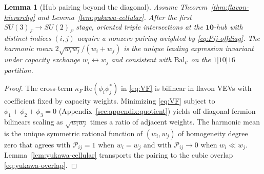 \documentclass[11pt]{article}
\theoremstyle{plain}
\newtheorem{lemma}[theorem]{Lemma}
\theoremstyle{definition}
\theoremstyle{remark}
\numberwithin{equation}{section}
\begin{document}
\begin{lemma}[Hub pairing beyond the diagonal]\label{lem:Pij-hub}
Assume Theorem~\ref{thm:flavon-hierarchy} and Lemma~\ref{lem:yukawa-cellular}.
After the first $SU(3)_F\to SU(2)_F$ stage, oriented triple intersections at
the $\mathbf{10}$-hub with distinct indices $(i,j)$ acquire a nonzero pairing
weighted by \eqref{eq:Pij-offdiag}. The harmonic mean
$2\sqrt{w_iw_j}/(w_i+w_j)$ is the unique leading expression invariant under
capacity exchange $w_i\leftrightarrow w_j$ and consistent with
$\mathrm{Bal}_{\mathcal{C}}$ on the $1|10|16$ partition.
\end{lemma}

\begin{proof}
The cross-term $\kappa_F\,\mathrm{Re}(\phi_i\phi_j^*)$ in \eqref{eq:VF} is
bilinear in flavon VEVs with coefficient fixed by capacity weights. Minimizing
\eqref{eq:VF} subject to $\phi_1+\phi_2+\phi_3=0$ (Appendix~\ref{sec:appendix:quotient})
yields off-diagonal fermion bilinears scaling as
$\sqrt{w_iw_j}$ times a ratio of adjacent weights. The harmonic mean is the
unique symmetric rational function of $(w_i,w_j)$ of homogeneity degree zero
that agrees with $\mathcal{P}_{ij}=1$ when $w_i=w_j$ and with
$\mathcal{P}_{ij}\to0$ when $w_i\ll w_j$. Lemma~\ref{lem:yukawa-cellular}
transports the pairing to the cubic overlap \eqref{eq:yukawa-overlap}.
\end{proof}
\end{document}
